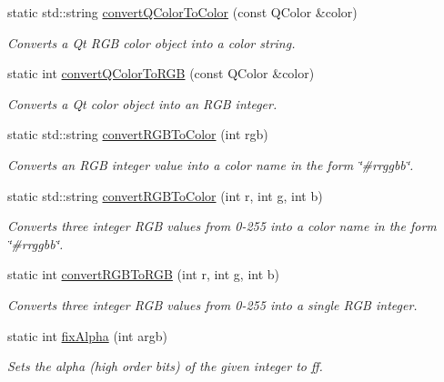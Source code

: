 \begin{DoxyCompactItemize}
static std\+::string \mbox{\hyperlink{classsgl_1_1GColor_a2ad78585a77dad65eb23299714545f7c}{convert\+Q\+Color\+To\+Color}} (const Q\+Color \&color)
\begin{DoxyCompactList}\small\item\em Converts a Qt R\+GB color object into a color string. \end{DoxyCompactList}\item 
static int \mbox{\hyperlink{classsgl_1_1GColor_a30f06933a10f00500d6b7991f8b61dde}{convert\+Q\+Color\+To\+R\+GB}} (const Q\+Color \&color)
\begin{DoxyCompactList}\small\item\em Converts a Qt color object into an R\+GB integer. \end{DoxyCompactList}\item 
static std\+::string \mbox{\hyperlink{classsgl_1_1GColor_a64353dd79967412aeebe46219e4a71df}{convert\+R\+G\+B\+To\+Color}} (int rgb)
\begin{DoxyCompactList}\small\item\em Converts an R\+GB integer value into a color name in the form {\ttfamily \char`\"{}\#rrggbb\char`\"{}}. \end{DoxyCompactList}\item 
static std\+::string \mbox{\hyperlink{classsgl_1_1GColor_a906729a293e62f8d112037016af21f9f}{convert\+R\+G\+B\+To\+Color}} (int r, int g, int b)
\begin{DoxyCompactList}\small\item\em Converts three integer R\+GB values from 0-\/255 into a color name in the form {\ttfamily \char`\"{}\#rrggbb\char`\"{}}. \end{DoxyCompactList}\item 
static int \mbox{\hyperlink{classsgl_1_1GColor_a7c4acb134cfa913f8a127b300a4b10a0}{convert\+R\+G\+B\+To\+R\+GB}} (int r, int g, int b)
\begin{DoxyCompactList}\small\item\em Converts three integer R\+GB values from 0-\/255 into a single R\+GB integer. \end{DoxyCompactList}\item 
static int \mbox{\hyperlink{classsgl_1_1GColor_a0dd42e0c5898738e5edb542e06b7496c}{fix\+Alpha}} (int argb)
\begin{DoxyCompactList}\small\item\em Sets the \textquotesingle{}alpha\textquotesingle{} (high order bits) of the given integer to ff. \end{DoxyCompactList}\item 

\end{DoxyCompactItemize}
